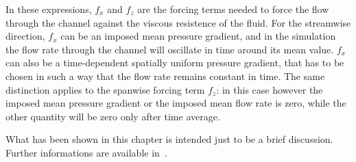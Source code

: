  In these expressions, $f_{x}$ and $f_{z}$ are the forcing terms needed to force the flow through the channel against the viscous resistence of the fluid. For the streamwise direction, $f_{x}$ can be an imposed mean pressure gradient, and in the simulation the flow rate through the channel will oscillate in time around its mean value. $f_{x}$ can also be a time-dependent spatially uniform pressure gradient, that has to be chosen in such a way that the flow rate remains constant in time. The same distinction applies to the spanwise forcing term $f_{z}$: in this case however the imposed mean pressure gradient or the imposed mean flow rate is zero, while the other quantity will be zero only after time average.\\
\par
\par
What has been shown in this chapter is intended just to be a brief discussion. Further informations are available in~\cite[1-3]{cpl:presentazione}.

